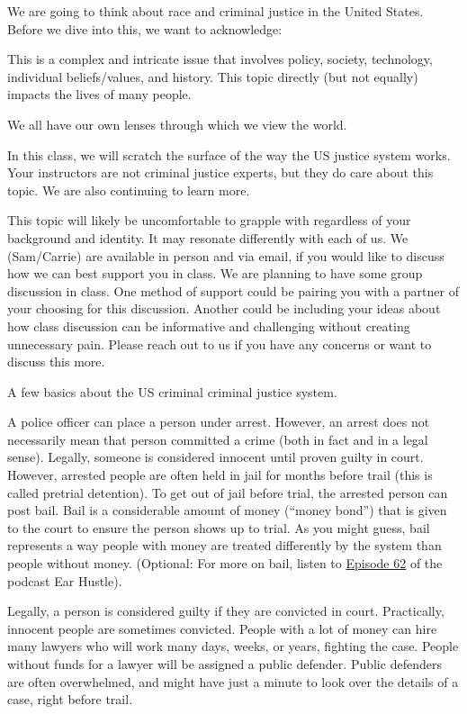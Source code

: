 \documentclass[assignment02_Solutions]{subfiles}
\begin{document}
\begin{notice}
We are going to think about race and criminal justice in the United States. Before we dive into this, we want to acknowledge:

\bi
\item This is a complex and intricate issue that involves policy, society, technology, individual beliefs/values, and history. This topic directly (but not equally) impacts the lives of many people.
\item We all have our own lenses through which we view the world.
\item In this class, we will scratch the surface of the way the US justice system works. Your instructors are not criminal justice experts, but they do care about this topic. We are also continuing to learn more.
\item This topic will likely be uncomfortable to grapple with regardless of your background and identity. It may resonate differently with each of us. We (Sam/Carrie) are available in person and via email, if you would like to discuss how we can best support you in class. We are planning to have some group discussion in class. One method of support could be pairing you with a partner of your choosing for this discussion. Another could be including your ideas about how class discussion can be informative and challenging without creating unnecessary pain. Please reach out to us if you have any concerns or want to discuss this more.
\ei
\end{notice}

A few basics about the US criminal criminal justice system. 

A police officer can place a person under arrest. However, an arrest does not necessarily mean that person committed a crime (both in fact and in a legal sense). Legally, someone is considered innocent until proven guilty in court. However, arrested people are often held in jail for months before trail (this is called pretrial detention). To get out of jail before trial, the arrested person can post bail. Bail is a considerable amount of money (``money bond'') that is given to the court to ensure the person shows up to trial. As you might guess, bail represents a way people with money are treated differently by the system than people without money.  (Optional: For more on bail, listen to \href{https://www.earhustlesq.com/episodes/2021/9/22/do-it-movin}{Episode 62} of the podcast Ear Hustle). 

Legally, a person is considered guilty if they are convicted in court. Practically, innocent people are sometimes convicted. People with a lot of money can hire many lawyers who will work many days, weeks, or years, fighting the case. People without funds for a lawyer will be assigned a public defender. Public defenders are often overwhelmed, and might have just a minute to look over the details of a case, right before trail.
\end{document}

